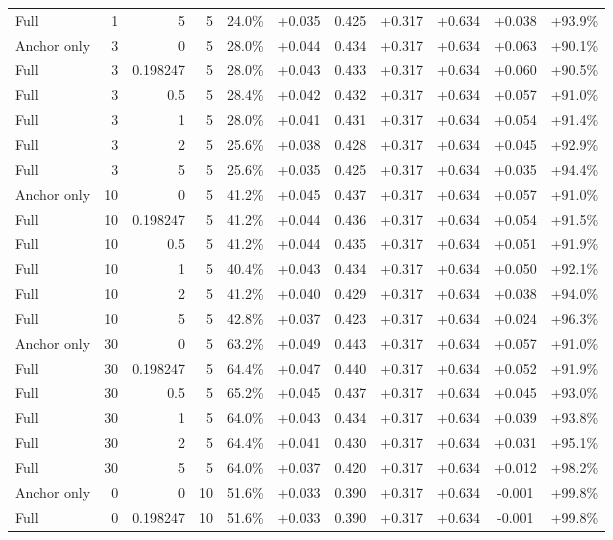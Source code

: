 \begin{table}[htbp]
\begin{tabular}{lrrrccccccc}
Full & 1 & 5 & 5 & 24.0\% & +0.035 & 0.425 & +0.317 & +0.634 & +0.038 & +93.9\% \\
Anchor only & 3 & 0 & 5 & 28.0\% & +0.044 & 0.434 & +0.317 & +0.634 & +0.063 & +90.1\% \\
Full & 3 & 0.198247 & 5 & 28.0\% & +0.043 & 0.433 & +0.317 & +0.634 & +0.060 & +90.5\% \\
Full & 3 & 0.5 & 5 & 28.4\% & +0.042 & 0.432 & +0.317 & +0.634 & +0.057 & +91.0\% \\
Full & 3 & 1 & 5 & 28.0\% & +0.041 & 0.431 & +0.317 & +0.634 & +0.054 & +91.4\% \\
Full & 3 & 2 & 5 & 25.6\% & +0.038 & 0.428 & +0.317 & +0.634 & +0.045 & +92.9\% \\
Full & 3 & 5 & 5 & 25.6\% & +0.035 & 0.425 & +0.317 & +0.634 & +0.035 & +94.4\% \\
Anchor only & 10 & 0 & 5 & 41.2\% & +0.045 & 0.437 & +0.317 & +0.634 & +0.057 & +91.0\% \\
Full & 10 & 0.198247 & 5 & 41.2\% & +0.044 & 0.436 & +0.317 & +0.634 & +0.054 & +91.5\% \\
Full & 10 & 0.5 & 5 & 41.2\% & +0.044 & 0.435 & +0.317 & +0.634 & +0.051 & +91.9\% \\
Full & 10 & 1 & 5 & 40.4\% & +0.043 & 0.434 & +0.317 & +0.634 & +0.050 & +92.1\% \\
Full & 10 & 2 & 5 & 41.2\% & +0.040 & 0.429 & +0.317 & +0.634 & +0.038 & +94.0\% \\
Full & 10 & 5 & 5 & 42.8\% & +0.037 & 0.423 & +0.317 & +0.634 & +0.024 & +96.3\% \\
Anchor only & 30 & 0 & 5 & 63.2\% & +0.049 & 0.443 & +0.317 & +0.634 & +0.057 & +91.0\% \\
Full & 30 & 0.198247 & 5 & 64.4\% & +0.047 & 0.440 & +0.317 & +0.634 & +0.052 & +91.9\% \\
Full & 30 & 0.5 & 5 & 65.2\% & +0.045 & 0.437 & +0.317 & +0.634 & +0.045 & +93.0\% \\
Full & 30 & 1 & 5 & 64.0\% & +0.043 & 0.434 & +0.317 & +0.634 & +0.039 & +93.8\% \\
Full & 30 & 2 & 5 & 64.4\% & +0.041 & 0.430 & +0.317 & +0.634 & +0.031 & +95.1\% \\
Full & 30 & 5 & 5 & 64.0\% & +0.037 & 0.420 & +0.317 & +0.634 & +0.012 & +98.2\% \\
Anchor only & 0 & 0 & 10 & 51.6\% & +0.033 & 0.390 & +0.317 & +0.634 & -0.001 & +99.8\% \\
Full & 0 & 0.198247 & 10 & 51.6\% & +0.033 & 0.390 & +0.317 & +0.634 & -0.001 & +99.8\% \\

\end{tabular}
\end{table}
